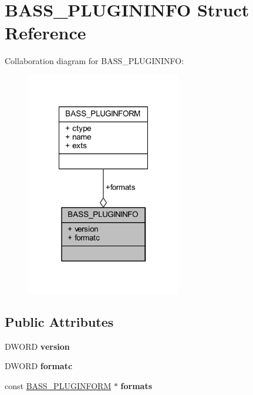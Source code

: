 \hypertarget{struct_b_a_s_s___p_l_u_g_i_n_i_n_f_o}{\section{B\-A\-S\-S\-\_\-\-P\-L\-U\-G\-I\-N\-I\-N\-F\-O Struct Reference}
\label{struct_b_a_s_s___p_l_u_g_i_n_i_n_f_o}
}


Collaboration diagram for B\-A\-S\-S\-\_\-\-P\-L\-U\-G\-I\-N\-I\-N\-F\-O\-:\nopagebreak
\begin{figure}[H]
\begin{center}
\leavevmode
\includegraphics[width=192pt]{struct_b_a_s_s___p_l_u_g_i_n_i_n_f_o__coll__graph}
\end{center}
\end{figure}
\subsection*{Public Attributes}
\begin{DoxyCompactItemize}
\item 
\hypertarget{struct_b_a_s_s___p_l_u_g_i_n_i_n_f_o_a893c8f212060896e986b82487c9710a2_a893c8f212060896e986b82487c9710a2}{D\-W\-O\-R\-D {\bfseries version}}\label{struct_b_a_s_s___p_l_u_g_i_n_i_n_f_o_a893c8f212060896e986b82487c9710a2_a893c8f212060896e986b82487c9710a2}

\item 
\hypertarget{struct_b_a_s_s___p_l_u_g_i_n_i_n_f_o_a45daf6218ce12dd4e8fc01316b9852e9_a45daf6218ce12dd4e8fc01316b9852e9}{D\-W\-O\-R\-D {\bfseries formatc}}\label{struct_b_a_s_s___p_l_u_g_i_n_i_n_f_o_a45daf6218ce12dd4e8fc01316b9852e9_a45daf6218ce12dd4e8fc01316b9852e9}

\item 
\hypertarget{struct_b_a_s_s___p_l_u_g_i_n_i_n_f_o_a1db793e75635c11854a924f4f42c3376_a1db793e75635c11854a924f4f42c3376}{const \hyperlink{struct_b_a_s_s___p_l_u_g_i_n_f_o_r_m}{B\-A\-S\-S\-\_\-\-P\-L\-U\-G\-I\-N\-F\-O\-R\-M} $\ast$ {\bfseries formats}}\label{struct_b_a_s_s___p_l_u_g_i_n_i_n_f_o_a1db793e75635c11854a924f4f42c3376_a1db793e75635c11854a924f4f42c3376}

\end{DoxyCompactItemize}


